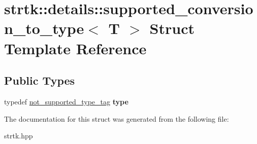 \hypertarget{structstrtk_1_1details_1_1supported__conversion__to__type}{\section{strtk\-:\-:details\-:\-:supported\-\_\-conversion\-\_\-to\-\_\-type$<$ T $>$ Struct Template Reference}
\label{structstrtk_1_1details_1_1supported__conversion__to__type}
}
\subsection*{Public Types}
\begin{DoxyCompactItemize}
\item 
\hypertarget{structstrtk_1_1details_1_1supported__conversion__to__type_a7a64803b10b5156c0545bb868ec8f644}{typedef \hyperlink{structstrtk_1_1details_1_1not__supported__type__tag}{not\-\_\-supported\-\_\-type\-\_\-tag} {\bfseries type}}\label{structstrtk_1_1details_1_1supported__conversion__to__type_a7a64803b10b5156c0545bb868ec8f644}

\end{DoxyCompactItemize}


The documentation for this struct was generated from the following file\-:\begin{DoxyCompactItemize}
\item 
strtk.\-hpp\end{DoxyCompactItemize}
